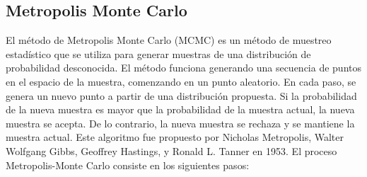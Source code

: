 \subsection{Metropolis Monte Carlo}


El m\'etodo de Metropolis Monte Carlo (MCMC) es un m\'etodo de muestreo estad\'istico que se utiliza para generar muestras de una distribuci\'on de probabilidad desconocida. El m\'etodo funciona generando una secuencia de puntos en el espacio de la muestra, comenzando en un punto aleatorio. En cada paso, se genera un nuevo punto a partir de una distribuci\'on propuesta. Si la probabilidad de la nueva muestra es mayor que la probabilidad de la muestra actual, la nueva muestra se acepta. De lo contrario, la nueva muestra se rechaza y se mantiene la muestra actual. 
Este algoritmo fue propuesto por Nicholas Metropolis, Walter Wolfgang Gibbs, Geoffrey Hastings, y Ronald L. Tanner en 1953. \cite{metropolis1953rosenbluth}
El proceso Metropolis-Monte Carlo consiste en los siguientes pasos:

